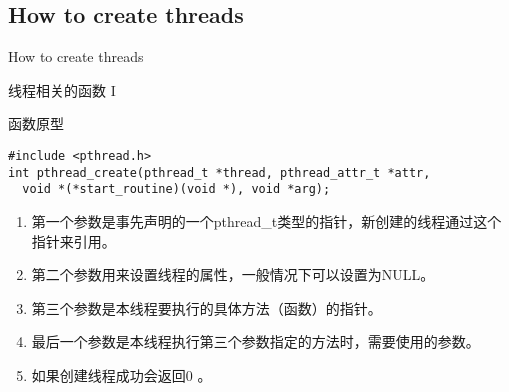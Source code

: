 \documentclass{beamer}
\begin{document}
\subsection{How to create threads}
\begin{frame}
\Huge{\centerline{How to create threads}}
\end{frame}
\begin{frame}[fragile]{线程相关的函数 I}
\begin{block}{函数原型}
\begin{verbatim}
#include <pthread.h>
int pthread_create(pthread_t *thread, pthread_attr_t *attr, 
  void *(*start_routine)(void *), void *arg);
\end{verbatim}
\begin{enumerate}
\item
第一个参数是事先声明的一个pthread\_t类型的指针，新创建的线程通过这个指针来引用。
\item
第二个参数用来设置线程的属性，一般情况下可以设置为NULL。
\item
第三个参数是本线程要执行的具体方法（函数）的指针。
\item
最后一个参数是本线程执行第三个参数指定的方法时，需要使用的参数。
\item
如果创建线程成功会返回0 。
\end{enumerate}
\end{block}
\end{frame}
\end{document}
